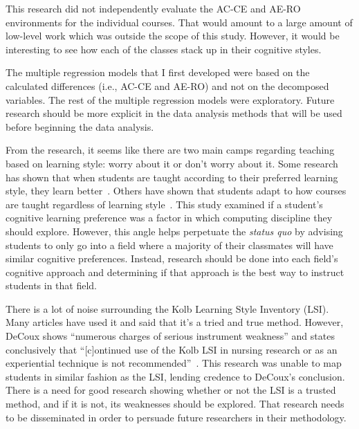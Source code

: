 This research did not independently evaluate the AC-CE and AE-RO environments for the individual courses. That would amount to a large amount of low-level work which was outside the scope of this study. However, it would be interesting to see how each of the classes stack up in their cognitive styles.

The multiple regression models that I first developed were based on the calculated differences (i.e., AC-CE and AE-RO) and not on the decomposed variables. The rest of the multiple regression models were exploratory. Future research should be more explicit in the data analysis methods that will be used before beginning the data analysis.

From the research, it seems like there are two main camps regarding teaching based on learning style: worry about it or don't worry about it. Some research has shown that when students are taught according to their preferred learning style, they learn better~\citep{vizeshfar2017, donche2013}. Others have shown that students adapt to how courses are taught regardless of learning style~\citep{wang2013}. This study examined if a student's cognitive learning preference was a factor in which computing discipline they should explore. However, this angle helps perpetuate the \textit{status quo} by advising students to only go into a field where a majority of their classmates will have similar cognitive preferences. Instead, research should be done into each field's cognitive approach and determining if that approach is the best way to instruct students in that field.

There is a lot of noise surrounding the Kolb Learning Style Inventory (LSI). Many articles have used it and said that it's a tried and true method. However, DeCoux shows ``numerous charges of serious instrument weakness'' and states conclusively that ``[c]ontinued use of the Kolb LSI in nursing research or as an experiential technique is not recommended''~\citep{decoux2016}. This research was unable to map students in similar fashion as the LSI, lending credence to DeCoux's conclusion. There is a need for good research showing whether or not the LSI is a trusted method, and if it is not, its weaknesses should be explored. That research needs to be disseminated in order to persuade future researchers in their methodology.
